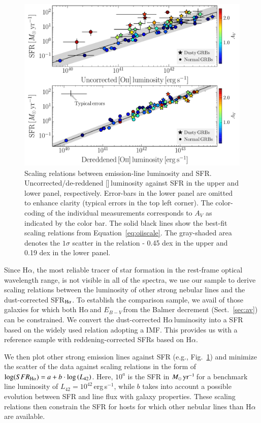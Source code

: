 \documentclass[traditabstract, longauth]{aa}
\newcommand{\ha}{H$\alpha$}
\newcommand{\ebv}{$E_{B-V}\,$}
\newcommand{\oii}{[\ion{O}{ii}]}
\newcommand{\Msunyr}{$M_\odot\,\rm{yr}^{-1}$}
\begin{document}
\begin{figure}
\includegraphics[angle=0, width=0.99\columnwidth]{Figs/Ha_OII.pdf}
\caption{Scaling relations between emission-line luminosity and SFR. Uncorrected/de-reddened \oii\,luminosity against SFR in the upper and lower panel, respectively. Error-bars in the lower panel are omitted to enhance clarity (typical errors in the top left corner). The color-coding of the individual measurements corresponds to $A_V$ as indicated by the color bar. The solid black lines show the best-fit scaling relations from Equation~\ref{eq:oiiscale}. The gray-shaded area denotes the $1\sigma$ scatter in the relation - 0.45 dex in the upper and 0.19 dex in the lower panel.}
\label{fig:haoii}
\end{figure}

Since \ha, the most reliable tracer of star formation in the rest-frame optical wavelength range, is not visible in all of the spectra, we use our sample to derive scaling relations between the luminosity of other strong nebular lines and the dust-corrected SFR$_{\rm{H}\alpha}$. To establish the comparison sample, we avail of those galaxies for which both \ha\,and \ebv from the Balmer decrement (Sect.~\ref{sec:av}) can be constrained. We convert the dust-corrected \ha\,luminosity into a SFR based on the widely used \citet{1998ARA&A..36..189K} relation adopting a \citet{2003PASP..115..763C} IMF. This provides us with a reference sample with reddening-corrected SFRs based on \ha.

We then plot other strong emission lines against SFR (e.g., Fig.~\ref{fig:haoii}) and minimize the scatter of the data against scaling relations in the form of $\log(SFR_{\rm{H}\alpha}) = a + b\cdot\log\left(L_{42}\right)$. Here, $10^{a}$ is the SFR in \Msunyr\,for a benchmark line luminosity of $L_{42}=10^{42}$\,erg\,{s}$^{-1}$, while $b$ takes into account a possible evolution between SFR and line flux with galaxy properties. These scaling relations then constrain the SFR for hosts for which other nebular lines than \ha\,are available.
\end{document}
